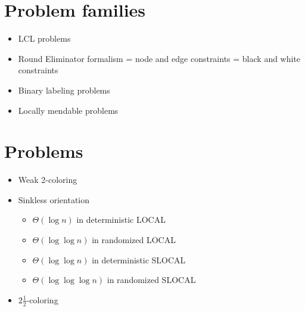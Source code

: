 \documentclass[a4paper,11pt]{article}
\begin{document}
\section{Problem families}
\begin{itemize}
    \item LCL problems \cite{naor-stockmeyer-1995-what-can-be-computed-locally}
    \item Round Eliminator formalism = node and edge constraints = black and white constraints \cite{olivetti-2020-brief-announcement-round-eliminator-a,olivetti-2025-round-eliminator-a-tool-for-automatic}
    \item Binary labeling problems \cite{balliu-brandt-etal-2020-classification-of-distributed}
    \item Locally mendable problems \cite{balliu-hirvonen-etal-2022-local-mending}
\end{itemize}

\section{Problems}
\begin{itemize}
    \item Weak 2-coloring \cite{naor-stockmeyer-1995-what-can-be-computed-locally}
    \item Sinkless orientation \cite{brandt-fischer-etal-2016-a-lower-bound-for-the}
    \begin{itemize}
        \item $\Theta(\log n)$ in deterministic LOCAL \cite{brandt-fischer-etal-2016-a-lower-bound-for-the,chang-kopelowitz-pettie-2019-an-exponential-separation,ghaffari-su-2017-distributed-degree-splitting-edge}
        \item $\Theta(\log \log n)$ in randomized LOCAL \cite{brandt-fischer-etal-2016-a-lower-bound-for-the,ghaffari-su-2017-distributed-degree-splitting-edge}
        \item $\Theta(\log \log n)$ in deterministic SLOCAL \cite{ghaffari-harris-kuhn-2018-on-derandomizing-local,ghaffari-su-2017-distributed-degree-splitting-edge}
        \item $\Theta(\log \log \log n)$ in randomized SLOCAL \cite{ghaffari-harris-kuhn-2018-on-derandomizing-local,ghaffari-su-2017-distributed-degree-splitting-edge}
    \end{itemize}
    \item $2\frac{1}{2}$-coloring \cite{chang-pettie-2019-a-time-hierarchy-theorem-for-the}
\end{itemize}
\end{document}
